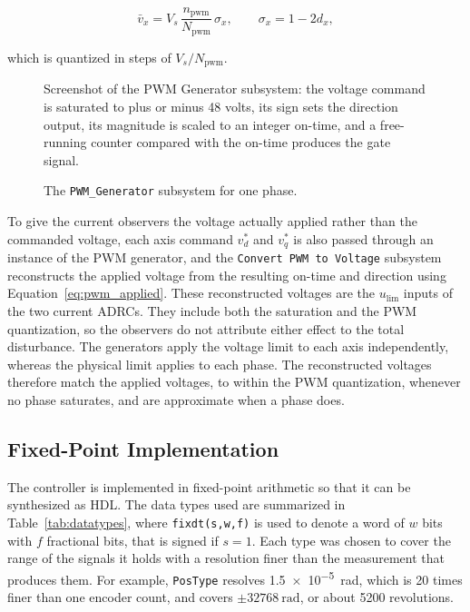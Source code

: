 \begin{equation}
	\bar{v}_x = V_s\, \frac{n_{\mathrm{pwm}}}{N_{\mathrm{pwm}}}\, \sigma_x,
	\qquad \sigma_x = 1 - 2 d_x,
	\label{eq:pwm_applied}
\end{equation}

which is quantized in steps of $V_s / N_{\mathrm{pwm}}$.
\begin{figure}[htbp]
	\centering
		{Screenshot of the PWM Generator subsystem: the voltage command is saturated to plus or minus 48 volts, its sign sets the direction output, its magnitude is scaled to an integer on-time, and a free-running counter compared with the on-time produces the gate signal.}
	\caption[The PWM generator subsystem]{The \texttt{PWM\_Generator} subsystem for one phase.}
	\label{fig:pwm_generator}
\end{figure}

To give the current observers the voltage actually applied rather than the commanded voltage, each axis command $v_d^{*}$ and $v_q^{*}$ is also passed through an instance of the PWM generator, and the \texttt{Convert PWM to Voltage} subsystem reconstructs the applied voltage from the resulting on-time and direction using Equation~\eqref{eq:pwm_applied}. These reconstructed voltages are the $u_{\mathrm{lim}}$ inputs of the two current ADRCs. They include both the saturation and the PWM quantization, so the observers do not attribute either effect to the total disturbance. The generators apply the voltage limit to each axis independently, whereas the physical limit applies to each phase. The reconstructed voltages therefore match the applied voltages, to within the PWM quantization, whenever no phase saturates, and are approximate when a phase does.

\subsection{Fixed-Point Implementation}\label{sec:fixedPoint}

The controller is implemented in fixed-point arithmetic so that it can be synthesized as HDL. The data types used are summarized in Table~\ref{tab:datatypes}, where \texttt{fixdt(s,w,f)} is used to denote a word of $w$ bits with $f$ fractional bits, that is signed if $s = 1$. Each type was chosen to cover the range of the signals it holds with a resolution finer than the measurement that produces them. For example, \texttt{PosType} resolves \SI{1.5e-5}{\radian}, which is 20 times finer than one encoder count, and covers $\pm\SI{32768}{\radian}$, or about 5200 revolutions.

